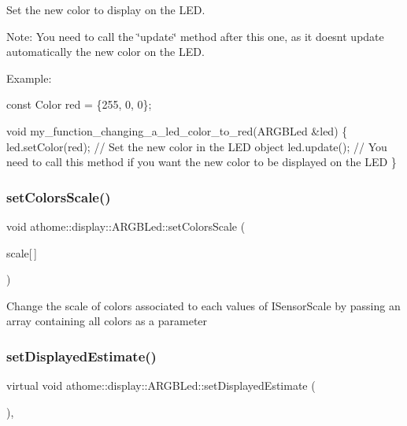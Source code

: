 Set the new color to display on the L\+ED.

Note\+: You need to call the \char`\"{}update\char`\"{} method after this one, as it doesn\textquotesingle{}t update automatically the new color on the L\+ED.

Example\+:


\begin{DoxyCode}
\textcolor{keyword}{const} Color red = \{255, 0, 0\};

\textcolor{keywordtype}{void} my\_function\_changing\_a\_led\_color\_to\_red(ARGBLed &led) \{
  led.setColor(red); \textcolor{comment}{// Set the new color in the LED object}
  led.update(); \textcolor{comment}{// You need to call this method if you want the new color to be displayed on the LED}
\}
\end{DoxyCode}
 \mbox{\label{classathome_1_1display_1_1_a_r_g_b_led_a411b35199d593b813bad7d9056678198}} 
\subsubsection{\texorpdfstring{set\+Colors\+Scale()}{setColorsScale()}}
{\footnotesize\ttfamily void athome\+::display\+::\+A\+R\+G\+B\+Led\+::set\+Colors\+Scale (\begin{DoxyParamCaption}\item[{const \mbox{\hyperlink{structathome_1_1display_1_1_a_r_g_b_led_1_1_color}{Color}}}]{scale\mbox{[}$\,$\mbox{]} }\end{DoxyParamCaption})\hspace{0.3cm}{\ttfamily [inline]}}

Change the scale of colors associated to each values of I\+Sensor\+Scale by passing an array containing all colors as a parameter \mbox{\label{classathome_1_1display_1_1_a_r_g_b_led_a1e6a934912f71a5ea06df1d28cf5ace9}} 
\subsubsection{\texorpdfstring{set\+Displayed\+Estimate()}{setDisplayedEstimate()}}
{\footnotesize\ttfamily virtual void athome\+::display\+::\+A\+R\+G\+B\+Led\+::set\+Displayed\+Estimate (\begin{DoxyParamCaption}\item[{\mbox{\hyperlink{classathome_1_1sensor_1_1_i_sensor_aa70bc27a4c17c86caf96cca776541ddf}{sensor\+::\+I\+Sensor\+::\+I\+Sensor\+Scale}}}]{ }\end{DoxyParamCaption})\hspace{0.3cm}{\ttfamily [inline]}, {\ttfamily [virtual]}}

